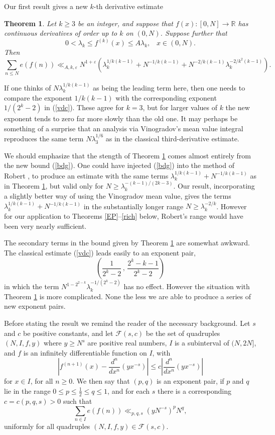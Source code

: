 \documentclass[a4paper,10pt]{article}
\newcommand{\R}{\mathbb{R}}
\newcommand{\ep}{\varepsilon}
\newcommand{\lk}{\lambda_k}
\newtheorem{theorem}{Theorem}
\begin{document}
Our first result gives a new $k$-th derivative estimate
\begin{theorem}\label{esV}
Let $k\ge 3$ be an integer, and
suppose that $f(x):[0,N]\to\R$ has continuous
derivatives of order up to $k$ on $(0,N)$.  Suppose further that 
\[0<\lambda_k\le f^{(k)}(x)\le A\lambda_k,\;\;\; x\in (0,N). \]
Then
\[
\sum_{n\le N}e(f(n)) \ll_{A,k,\ep} 
N^{1+\ep}(\lk^{1/k(k-1)}+N^{-1/k(k-1)}+N^{-2/k(k-1)}\lk^{-2/k^2(k-1)}).
\]
\end{theorem}

If one thinks of $N\lk^{1/k(k-1)}$ as being the leading term here,
then one needs to compare the exponent $1/k(k-1)$ with the
corresponding exponent $1/(2^k-2)$ in (\ref{vdc}).  These agree for
$k=3$, but for larger values of $k$ the new exponent tends to zero far
more slowly than the old one.  It may perhaps be something of a
surprise that an analysis via Vinogradov's mean value integral
reproduces the same term $N\lambda_3^{1/6}$ as in the classical
third-derivative estimate.

We should emphasize that the stength of Theorem \ref{esV} comes almost
entirely from the new bound (\ref{bdg}). One could have injected
(\ref{bdg}) into the method of Robert \cite{Rob}, to produce an
estimate with the same terms $\lk^{1/k(k-1)}+N^{-1/k(k-1)}$ as in
Theorem \ref{esV}, but valid only for $N\ge \lk^{-(k-1)/(2k-3)}$.
Our result, incorporating a slightly better way of using the
Vinogradov mean value, gives the terms $\lk^{1/k(k-1)}+N^{-1/k(k-1)}$
in the substantially longer range $N\ge \lk^{-2/k}$.  However for our
application to Theorems \ref{EP}--\ref{rich} below, Robert's range
would have been very nearly sufficient.

The secondary terms in the bound given by Theorem \ref{esV} 
are somewhat awkward. The
classical estimate (\ref{vdc}) leads easily to an exponent pair, 
\[\left(\frac{1}{2^k-2}\,,\,\frac{2^k-k-1}{2^k-2}\right)\]
in which the term $N^{1-2^{2-k}}\lk^{-1/(2^k-2)}$ has no effect.
However the situation with Theorem \ref{esV} is more complicated. None 
the less we are able to produce a series of new exponent pairs. 

Before stating the
result we remind the reader of the necessary background. Let $s$ and
$c$ be positive constants, and let $\mathcal{F}(s,c)$ be the set of
quadruples $(N,I,f,y)$ where $y\ge N^s$ are positive real numbers, $I$
is a subinterval of $(N,2N]$, and $f$ is an infinitely differentiable
function on $I$, with 
\[\left|f^{(n+1)}(x)-\frac{d^n}{dx^n}(yx^{-s})\right|\le c
\left|\frac{d^n}{dx^n}(yx^{-s})\right|\]
for $x\in I$, for all $n\ge 0$.  We then say that $(p,q)$ is an
exponent pair, if $p$ and $q$ lie in the range
$0\le p\le\tfrac12\le q\le 1$, and for each $s$ there
is a corresponding $c=c(p,q,s)>0$ such that
\[\sum_{n\in I}e(f(n))\ll_{p,q,s} (yN^{-s})^p N^q,\]
uniformly for all quadruples $(N,I,f,y)\in\mathcal{F}(s,c)$.
\end{document}
